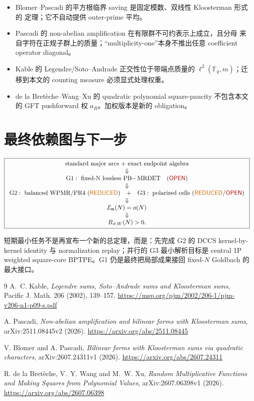 \documentclass[11pt,a4paper]{ctexart}
\theoremstyle{definition}
\newcommand{\F}{\mathbb F}
\newcommand{\E}{\mathcal E}
\newcommand{\OPEN}{\textcolor{red!70!black}{\textsf{OPEN}}}
\newcommand{\REDUCED}{\textcolor{orange!80!black}{\textsf{REDUCED}}}
\begin{document}
\begin{itemize}
\item Blomer--Pascadi 的平方根临界 saving 是固定模数、双线性 Kloosterman 形式的
定理；它不自动提供 outer-prime 平均。
\item Pascadi 的 non-abelian amplification 在有限群不可约表示上成立，且分母
来自字符在正规子群上的质量；“multiplicity-one”本身不推出任意 coefficient
operator diagonal。
\item Kable 的 Legendre/Soto--Andrade 正交性位于带端点质量的
$\ell^2(\F_q,m)$；迁移到本文的 counting measure 必须显式处理权重。
\item de la Bret\`eche--Wang--Xu 的 quadratic polynomial square-paucity
不包含本文的 GFT pushforward 权 $a_R$。加权版本是新的 obligation。
\end{itemize}

\section{最终依赖图与下一步}

\[
\boxed{
\begin{array}{c}
\text{standard major arcs + exact endpoint algebra}\\
\Downarrow\\
\mathrm{G1:\ fixed\text{-}N\ lossless\ PB\!\!-
MRDET}\quad(\OPEN)\\
\Downarrow\\
\begin{matrix}
\mathrm{G2:\ balanced\ WPMR/PR4}\ (\REDUCED)
&+&
\mathrm{G3:\ polarized\ cells}\ (\REDUCED/\OPEN)
\end{matrix}\\
\Downarrow\\
\E_{\mathfrak m}(N)=o(N)\\
\Downarrow\\
R_{\vartheta,W}(N)>0.
\end{array}}
\]

短期最小任务不是再宣布一个新的总定理，而是：先完成 G2 的 DCCS
kernel-by-kernel identity 与 normalization replay；并行的 G3 最小解析目标是
central 1P weighted square-core BPTPE。G1 仍是最终把局部成果接回 fixed-$N$
Goldbach 的最大接口。

\begin{thebibliography}{9}
A.~C. Kable,
\emph{Legendre sums, Soto--Andrade sums and Kloosterman sums},
Pacific J. Math. 206 (2002), 139--157.
\url{https://msp.org/pjm/2002/206-1/pjm-v206-n1-p09-s.pdf}

A. Pascadi,
\emph{Non-abelian amplification and bilinear forms with Kloosterman sums},
arXiv:2511.08445v2 (2026).
\url{https://arxiv.org/abs/2511.08445}

V. Blomer and A. Pascadi,
\emph{Bilinear forms with Kloosterman sums via quadratic characters},
arXiv:2607.24311v1 (2026).
\url{https://arxiv.org/abs/2607.24311}

R. de la Bret\`eche, V.~Y. Wang and M.~W. Xu,
\emph{Random Multiplicative Functions and Making Squares from Polynomial Values},
arXiv:2607.06398v1 (2026).
\url{https://arxiv.org/abs/2607.06398}
\end{thebibliography}
\end{document}
